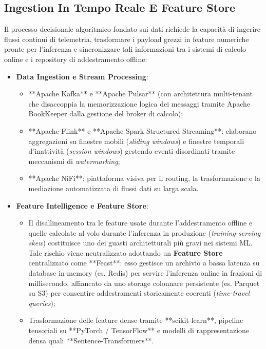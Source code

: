 \documentclass[11pt, a4paper]{article}
\begin{document}

\subsection{Ingestion In Tempo Reale E Feature Store}

Il processo decisionale algoritmico fondato sui dati richiede la capacità di ingerire flussi continui di telemetria, trasformare i payload grezzi in feature numeriche pronte per l'inferenza e sincronizzare tali informazioni tra i sistemi di calcolo online e i repository di addestramento offline:
\begin{itemize}
    \item \textbf{Data Ingestion e Stream Processing}:
    \begin{itemize}
        \item **Apache Kafka** e **Apache Pulsar** (con architettura multi-tenant che disaccoppia la memorizzazione logica dei messaggi tramite Apache BookKeeper dalla gestione del broker di calcolo);
        \item **Apache Flink** e **Apache Spark Structured Streaming**: elaborano aggregazioni su finestre mobili (\emph{sliding windows}) e finestre temporali d'inattività (\emph{session windows}) gestendo eventi disordinati tramite meccanismi di \emph{watermarking};
        \item **Apache NiFi**: piattaforma visiva per il routing, la trasformazione e la mediazione automatizzata di flussi dati su larga scala.
    \end{itemize}
    \item \textbf{Feature Intelligence e Feature Store}:
    \begin{itemize}
        \item Il disallineamento tra le feature usate durante l'addestramento offline e quelle calcolate al volo durante l'inferenza in produzione (\emph{training-serving skew}) costituisce uno dei guasti architetturali più gravi nei sistemi ML. Tale rischio viene neutralizzato adottando un \textbf{Feature Store} centralizzato come **Feast**: esso gestisce un archivio a bassa latenza su database in-memory (es. Redis) per servire l'inferenza online in frazioni di millisecondo, affiancato da uno storage colonnare persistente (es. Parquet su S3) per consentire addestramenti storicamente coerenti (\emph{time-travel queries});
        \item Trasformazione delle feature dense tramite **scikit-learn**, pipeline tensoriali su **PyTorch / TensorFlow** e modelli di rappresentazione densa quali **Sentence-Transformers**.
    \end{itemize}
\end{itemize}
\end{document}
